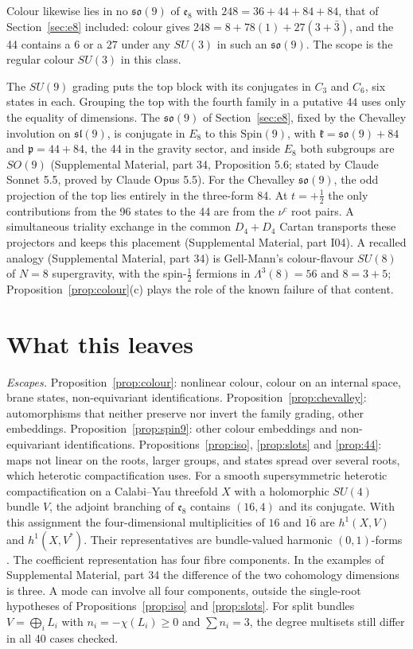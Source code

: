 \documentclass[aps,prd,reprint,onecolumn,nofootinbib,amsmath,amssymb,floatfix]{revtex4-2}
\theoremstyle{plain}
\newcommand{\supp}[1]{Supplemental Material, part #1}
\begin{document}
Colour likewise lies in no $\mathfrak{so}(9)$ of $\mathfrak e_8$ with $248=36+44+84+84$, that of Section~\ref{sec:e8} included: colour gives $248=8+78(1)+27(3+\bar3)$, and the 44 contains a $6$ or a $27$ under any $SU(3)$ in such an $\mathfrak{so}(9)$. The scope is the regular colour $SU(3)$ in this class.

The $SU(9)$ grading puts the top block with its conjugates in $C_3$ and $C_6$, six states in each. Grouping the top with the fourth family in a putative $44$ uses only the equality of dimensions. The $\mathfrak{so}(9)$ of Section~\ref{sec:e8}, fixed by the Chevalley involution on $\mathfrak{sl}(9)$, is conjugate in $E_8$ to this $\mathrm{Spin}(9)$, with $\mathfrak k=\mathfrak{so}(9)+84$ and $\mathfrak p=44+84$, the 44 in the gravity sector, and inside $E_8$ both subgroups are $SO(9)$ (\supp{34}, Proposition 5.6; stated by Claude Sonnet 5.5, proved by Claude Opus 5.5). For the Chevalley $\mathfrak{so}(9)$, the odd projection of the top lies entirely in the three-form 84. At $t=+\frac12$ the only contributions from the 96 states to the 44 are from the $\nu^c$ root pairs. A simultaneous triality exchange in the common $D_4+D_4$ Cartan transports these projectors and keeps this placement (\supp{I04}). A recalled analogy (\supp{34}) is Gell-Mann's colour-flavour $SU(8)$ of $N=8$ supergravity, with the spin-$\frac12$ fermions in $\Lambda^3(8)=56$ and $8=3+5$; Proposition~\ref{prop:colour}(c) plays the role of the known failure of that content.

\section{What this leaves}\label{sec:open}

\emph{Escapes.} Proposition~\ref{prop:colour}: nonlinear colour, colour on an internal space, brane states, non-equivariant identifications. Proposition~\ref{prop:chevalley}: automorphisms that neither preserve nor invert the family grading, other embeddings. Proposition~\ref{prop:spin9}: other colour embeddings and non-equivariant identifications. Propositions~\ref{prop:iso}, \ref{prop:slots} and \ref{prop:44}: maps not linear on the roots, larger groups, and states spread over several roots, which heterotic compactification uses. For a smooth supersymmetric heterotic compactification on a Calabi--Yau threefold $X$ with a holomorphic $SU(4)$ bundle $V$, the adjoint branching of $\mathfrak e_8$ contains $(16,4)$ and its conjugate. With this assignment the four-dimensional multiplicities of $16$ and $\overline{16}$ are $h^1(X,V)$ and $h^1(X,V^*)$. Their representatives are bundle-valued harmonic $(0,1)$-forms \cite{CHSW1985,Braun2005}. The coefficient representation has four fibre components. In the examples of \supp{34} the difference of the two cohomology dimensions is three. A mode can involve all four components, outside the single-root hypotheses of Propositions~\ref{prop:iso} and \ref{prop:slots}. For split bundles $V=\bigoplus_iL_i$ with $n_i=-\chi(L_i)\ge0$ and $\sum n_i=3$, the degree multisets still differ in all 40 cases checked.
\end{document}
